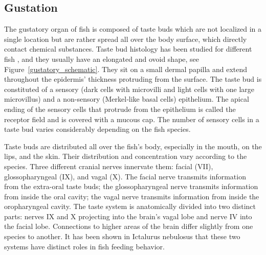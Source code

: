     \subsection{Gustation}
    The gustatory organ of fish is composed of taste buds which are not localized in a single location but are rather spread all over the body surface, which directly contact chemical substances. Taste bud histology has been studied for different fish \cite{kapoor1976gustatory,fishelson2004taste,reutter2000heterogeneity,reutter1991ultrastructure,reutter2012taste}, and they usually have an elongated and ovoid shape, see Figure~\ref{gustatory_schematic}. They sit on a small dermal papilla and extend throughout the epidermis' thickness protruding from the surface. The taste bud is constituted of a sensory (dark cells with microvilli and light cells with one large microvillus) and a non-sensory (Merkel‐like basal cells) epithelium. The apical ending of the sensory cells that protrude from the epithelium is called the receptor field and is covered with a mucous cap. The number of sensory cells in a taste bud varies considerably depending on the fish species.

    Taste buds are distributed all over the fish's body, especially in the mouth, on the lips, and the skin. Their distribution and concentration vary according to the species. Three different cranial nerves innervate them: facial (VII), glossopharyngeal (IX), and vagal (X). The facial nerve transmits information from the extra-oral taste buds; the glossopharyngeal nerve transmits information from inside the oral cavity; the vagal nerve transmits information from inside the oropharyngeal cavity. The taste system is anatomically divided into two distinct parts: nerves IX and X projecting into the brain's vagal lobe and nerve IV into the facial lobe. Connections to higher areas of the brain differ slightly from one species to another. It has been shown in Ictalurus nebulosus \cite{atema1971structures} that these two systems have distinct roles in fish feeding behavior.

